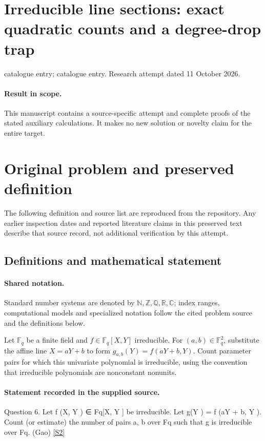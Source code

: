 \documentclass[11pt]{article}
\begin{document}
\section*{Irreducible line sections: exact quadratic counts and a degree-drop trap}
\noindent catalogue entry; catalogue entry. Research attempt dated 11 October 2026.
\paragraph{Result in scope.}This manuscript contains a source-specific attempt and complete proofs of the stated auxiliary calculations. It makes no new solution or novelty claim for the entire target.
\section{Original problem and preserved definition}
The following definition and source list are reproduced from the repository. Any earlier inspection dates and reported literature claims in this preserved text describe that source record, not additional verification by this attempt.
\subsection{Definitions and mathematical statement}

\paragraph{Shared notation.}Standard number systems are denoted by $\mathbb N,\mathbb Z,\mathbb Q,\mathbb R,\mathbb C$; index ranges, computational models and specialized notation follow the cited problem source and the definitions below.


Let $\mathbb F_q$ be a finite field and $f\in\mathbb F_q[X,Y]$ irreducible. For $(a,b)\in\mathbb F_q^2$, substitute the affine line $X=aY+b$ to form $g_{a,b}(Y)=f(aY+b,Y)$. Count parameter pairs for which this univariate polynomial is irreducible, using the convention that irreducible polynomials are nonconstant nonunits.
\paragraph{Statement recorded in the supplied source.}
Question 6. Let f (X, Y ) ∈ Fq[X, Y ] be irreducible. Let g(Y ) = f (aY + b, Y ). Count (or estimate) the number of pairs a, b over Fq such that g is irreducible over Fq. (Gao) \href{https://aimath.org/WWN/primesinp/primesinp.pdf}{[S2]}
\end{document}
